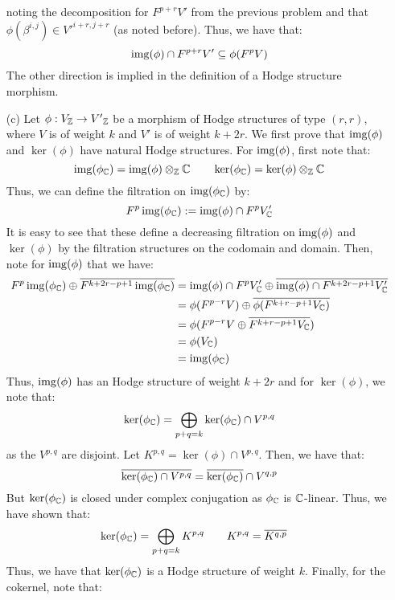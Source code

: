 \documentclass[12pt]{article}
\begin{document}
\begin{solution}
\begin{enumerate}
        noting the decomposition for $F^{p+r} V'$ from the previous problem and that $\phi(\beta^{i,j}) \in {V'}^{i+r, j+r}$ (as noted before). Thus, we have that:
        \[ \operatorname{img}(\phi) \cap F^{p+r}V' \subseteq \phi(F^{p}V) \]
        The other direction is implied in the definition of a Hodge structure morphism. 
        \item[(c)] Let $\phi: V_\mathbb Z \to {V'}_\mathbb Z$ be a morphism of Hodge structures of type $(r, r)$, where $V$ is of weight $k$ and $V'$ is of weight $k+2r$. We first prove that $\operatorname{img}(\phi)$ and $\ker(\phi)$ have natural Hodge structures. \bbni
        For $\operatorname{img}(\phi)$, first note that:
        \[ \operatorname{img}(\phi_\mathbb C) = \operatorname{img}(\phi) \otimes_\mathbb Z \mathbb C \qquad \ker(\phi_\mathbb C) = \ker(\phi) \otimes_\mathbb Z \mathbb C \]
        Thus, we can define the filtration on $\operatorname{img}(\phi_\mathbb C)$ by: 
        \[ F^p \operatorname{img}(\phi_\mathbb C) := \operatorname{img}(\phi) \cap F^{p} V'_\mathbb C \]    
        It is easy to see that these define a decreasing filtration on $\operatorname{img}(\phi)$ and $\ker(\phi)$ by the filtration structures on the codomain and domain. Then, note for $\operatorname{img}(\phi)$ that we have: 
        \begin{align*}
            F^{p} \operatorname{img}(\phi_\mathbb C) \oplus \overline{F^{k+2r-p+1} \operatorname{img}(\phi_\mathbb C)} 
            &= \operatorname{img}(\phi) \cap F^{p} V'_\mathbb C \oplus \overline{\operatorname{img}(\phi) \cap F^{k+2r-p+1} V'_\mathbb C} \\
            &= \phi(F^{p-r} V) \oplus \overline{\phi(F^{k+r-p+1} V_\mathbb C)} \\
            &= \phi(F^{p-r} V \oplus \overline{F^{k+r-p+1} V_\mathbb C}) \\
            &= \phi(V_\mathbb C) \\
            &= \operatorname{img}(\phi_\mathbb C)
        \end{align*}    
        Thus, $\operatorname{img}(\phi)$ has an Hodge structure of weight $k+2r$ and for $\ker(\phi)$, we note that:
        \[ \ker(\phi_\mathbb C) = \bigoplus_{p+q = k} \ker(\phi_\mathbb C) \cap V^{p,q}\]
        as the $V^{p, q}$ are disjoint. Let $K^{p, q} = \ker(\phi) \cap V^{p,q}$. Then, we have that: 
        \[ \overline{\ker(\phi_\mathbb C) \cap V^{p, q}} = \overline{\ker(\phi_\mathbb C)} \cap V^{q, p}\]
        But $\ker(\phi_\mathbb C)$ is closed under complex conjugation as $\phi_\mathbb C$ is $\mathbb C$-linear. Thus, we have shown that:
        \begin{align*}
            \ker(\phi_\mathbb C) &= \bigoplus_{p+q = k} K^{p, q}  \qquad K^{p, q} = \overline{K^{q, p}}
        \end{align*}
        Thus, we have that $\ker(\phi_\mathbb C)$ is a Hodge structure of weight $k$. \bbni
        Finally, for the cokernel, note that:
        \begin{align*}

\end{align*}
\end{enumerate}
\end{solution}
\end{document}

